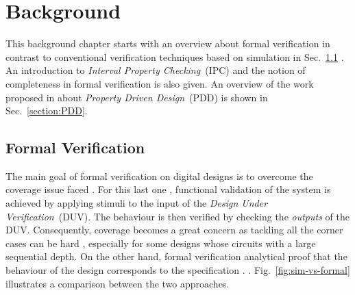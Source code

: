 \chapter{Background}
\label{chapter:backgroung}

This background chapter starts with an overview about formal verification in contrast to conventional verification techniques based on simulation in Sec.~\ref{section:formal-verification} . An introduction to \textit{Interval Property Checking}~(IPC) and the notion of completeness in formal verification is also given. An overview of the work proposed in \cite{paper-pdd} about \textit{Property Driven Design}~(PDD) is shown in Sec.~\ref{section:PDD}.


\section{Formal Verification}
\label{section:formal-verification}

The main goal of formal verification on digital designs is to overcome the coverage issue faced . For this last one , functional validation of the system is achieved by applying stimuli to the input of the \textit{Design Under Verification}~(DUV). The behaviour is then verified by checking the \textit{outputs} of the DUV.  Consequently, coverage becomes a great  concern as tackling  all the corner cases can be hard , especially for some designs whose  circuits with a large sequential depth. On the other hand, formal verification  analytical proof that the behaviour of the design corresponds to the specification . \cite{thesis-formal}. Fig.~\ref{fig:sim-vs-formal} illustrates a comparison between the two approaches.


